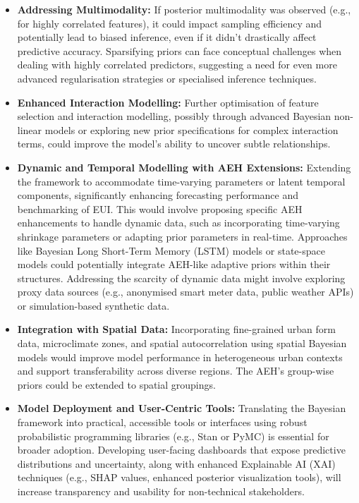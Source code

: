 \begin{itemize}
\item \textbf{Addressing Multimodality:} If posterior multimodality was observed (e.g., for highly correlated features), it could impact sampling efficiency and potentially lead to biased inference, even if it didn't drastically affect predictive accuracy. Sparsifying priors can face conceptual challenges when dealing with highly correlated predictors, suggesting a need for even more advanced regularisation strategies or specialised inference techniques.

\item \textbf{Enhanced Interaction Modelling:} Further optimisation of feature selection and interaction modelling, possibly through advanced Bayesian non-linear models or exploring new prior specifications for complex interaction terms, could improve the model's ability to uncover subtle relationships.

\item \textbf{Dynamic and Temporal Modelling with AEH Extensions:} Extending the framework to accommodate time-varying parameters or latent temporal components, significantly enhancing forecasting performance and benchmarking of EUI. This would involve proposing specific AEH enhancements to handle dynamic data, such as incorporating time-varying shrinkage parameters or adapting prior parameters in real-time. Approaches like Bayesian Long Short-Term Memory (LSTM) models or state-space models could potentially integrate AEH-like adaptive priors within their structures. Addressing the scarcity of dynamic data might involve exploring proxy data sources (e.g., anonymised smart meter data, public weather APIs) or simulation-based synthetic data.

\item \textbf{Integration with Spatial Data:} Incorporating fine-grained urban form data, microclimate zones, and spatial autocorrelation using spatial Bayesian models would improve model performance in heterogeneous urban contexts and support transferability across diverse regions. The AEH's group-wise priors could be extended to spatial groupings.

\item \textbf{Model Deployment and User-Centric Tools:} Translating the Bayesian framework into practical, accessible tools or interfaces using robust probabilistic programming libraries (e.g., Stan or PyMC) is essential for broader adoption. Developing user-facing dashboards that expose predictive distributions and uncertainty, along with enhanced Explainable AI (XAI) techniques (e.g., SHAP values, enhanced posterior visualization tools), will increase transparency and usability for non-technical stakeholders.


\end{itemize}
